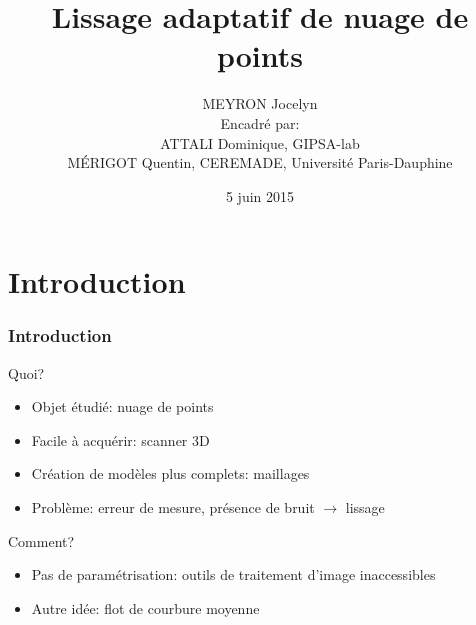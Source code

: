 \documentclass{beamer}
\title[Lissage adaptatif de nuage de points]{Lissage adaptatif de nuage de
    points}
\author[MEYRON Jocelyn]{MEYRON Jocelyn\\\scriptsize{Encadré par:\\
        ATTALI Dominique, GIPSA-lab\\
        MÉRIGOT Quentin, CEREMADE, Université Paris-Dauphine}}
\institute{GIPSA-lab}
\date{5 juin 2015}
\begin{document}
\begin{frame}
    \titlepage
\end{frame}

\begin{frame}
    \tableofcontents
\end{frame}

\section{Introduction}

\begin{frame}
    \frametitle{Introduction}

    Quoi?
    \begin{itemize}
        \item Objet étudié: nuage de points
        \item Facile à acquérir: scanner 3D
        \item Création de modèles plus complets: maillages
        \item Problème: erreur de mesure, présence de bruit $ \to $ lissage
    \end{itemize}

    Comment?
    \begin{itemize}
        \item Pas de paramétrisation: outils de traitement d'image inaccessibles
        \item Autre idée: flot de courbure moyenne
    \end{itemize}
\end{frame}
\end{document}
